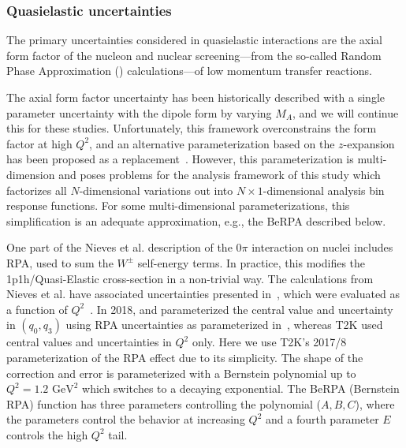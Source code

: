 \subsubsection{Quasielastic uncertainties}
The primary uncertainties considered in quasielastic interactions are the axial form factor of the nucleon and nuclear screening---from the so-called Random Phase Approximation () calculations---of low momentum transfer reactions.

The axial form factor uncertainty has been historically described with a single parameter uncertainty with the dipole form by varying $M_A$, and we will continue this for these studies.  Unfortunately, this framework overconstrains the form factor at high $Q^2$, and an alternative parameterization based on the $z$-expansion has been proposed as a replacement~\cite{Meyer:2016oeg}.  However, this parameterization is multi-dimension and poses problems for the analysis framework of this study which factorizes all $N$-dimensional variations out into $N\times{}1$-dimensional analysis bin response functions. For some multi-dimensional parameterizations, this simplification is an adequate approximation, e.g., the BeRPA described below. %

One part of the Nieves et al.\cite{Nieves:2011pp,Gran:2013kda} description of the $0\pi$ interaction on nuclei includes RPA, used to sum the $W^\pm$ self-energy terms. In practice, this modifies the 1p1h/Quasi-Elastic cross-section in a non-trivial way. The calculations from Nieves et al. have associated uncertainties presented in~\cite{Valverde:2006zn}, which were evaluated as a function of $Q^2$~\cite{sanchez-private}. In 2018, \minerva and \nova parameterized the central value and uncertainty in $(q_0, q_3)$ using RPA uncertainties as parameterized in~\cite{RikRPA}, whereas T2K used central values and uncertainties in $Q^2$ only. Here we use T2K's 2017/8 parameterization of the RPA effect\cite{Abe:2018wpn} due to its simplicity. The shape of the correction and error is parameterized with a Bernstein polynomial up to $Q^2=1.2\text{ GeV}^2$ which switches to a decaying exponential. The BeRPA (Bernstein RPA) function has three parameters controlling the polynomial ($A, B, C$), where the parameters control the behavior at increasing $Q^2$ and a fourth parameter $E$ controls the high $Q^2$ tail.

